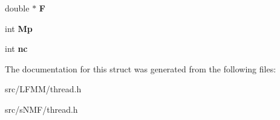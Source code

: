 \begin{DoxyCompactItemize}
\item 
\hypertarget{struct__matrix_a3a651d84baeb5c83e0bf563ba944a347}{double $\ast$ {\bfseries \-F}}\label{struct__matrix_a3a651d84baeb5c83e0bf563ba944a347}

\item 
\hypertarget{struct__matrix_a5a06c9a7b567f7a5c26590dd856f6de9}{int {\bfseries \-Mp}}\label{struct__matrix_a5a06c9a7b567f7a5c26590dd856f6de9}

\item 
\hypertarget{struct__matrix_ab3bfb95913580b97dc242a604be59325}{int {\bfseries nc}}\label{struct__matrix_ab3bfb95913580b97dc242a604be59325}

\end{DoxyCompactItemize}


\-The documentation for this struct was generated from the following files\-:\begin{DoxyCompactItemize}
\item 
src/\-L\-F\-M\-M/thread.\-h\item 
src/s\-N\-M\-F/thread.\-h\end{DoxyCompactItemize}
